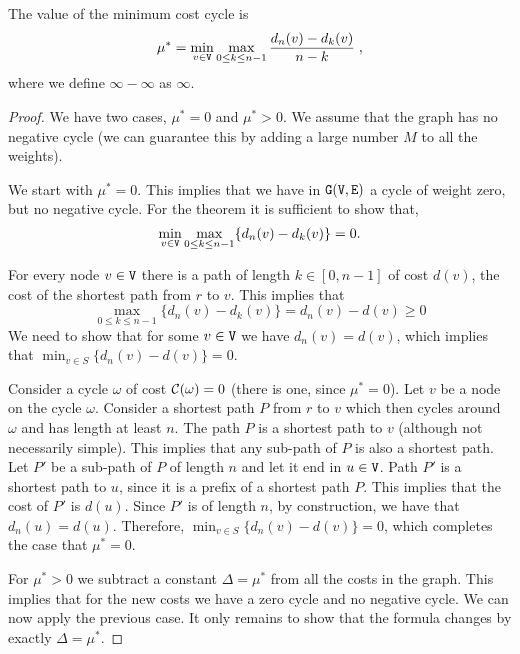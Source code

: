 \begin{theorem}
The value of the minimum cost cycle is
\[
\mu^*=\min_{v\in {\tt V}} \max_{0\leq k \leq n-1}
\frac{d_n(v)-d_{k}(v)}{n-k}\;,
\]
where we define $\infty-\infty$ as $\infty$.
\end{theorem}

\begin{proof}
We have two cases, $\mu^*=0$ and $\mu^*>0$. We assume that the graph
has no negative cycle (we can guarantee this by adding a large
number $M$ to all the weights).

We start with $\mu^*=0$. This implies that we have in ${\tt G}({\tt V},{\tt E})$ a
cycle of weight zero, but no negative cycle. For the theorem it is
sufficient to show that,
\[
\min_{v\in {\tt V}} \max_{0\leq k \leq n-1} \{d_n(v)-d_{k}(v)\}=0.
\]

For every node $v\in {\tt V}$ there is a path of length $k\in[0,n-1]$ of
cost $d(v)$, the cost of the shortest path from $r$ to $v$. This
implies that
\[
\max_{0\leq k \leq n-1} \{d_n(v)-d_{k}(v)\}=d_n(v)-d(v)\geq 0
\]
We need to show that for some $v\in {\tt V}$ we have $d_n(v)=d(v)$, which
implies that $\min_{v\in S} \{d_n(v)-d(v)\}=0$.

Consider a cycle $\omega$ of cost $\mathcal{C}(\omega)=0$ (there is one,
since $\mu^*=0$). Let $v$ be a node on the cycle $\omega$. Consider
a shortest path $P$ from $r$ to $v$ which then cycles around $\omega$ and has
length at least $n$. The path $P$ is a shortest path to $v$
(although not necessarily simple). This implies that any sub-path of
$P$ is also a shortest path. Let $P'$ be a sub-path of $P$ of length
$n$ and let it end in $u\in {\tt V}$.
%
Path $P'$ is a shortest path to $u$, since it is a prefix of a
shortest path $P$.
%
This implies that the cost of $P'$ is $d(u)$. Since $P'$ is of
length $n$, by construction, we have that $d_n(u)=d(u)$. Therefore,
$\min_{v\in S} \{d_n(v)-d(v)\}=0$, which completes the case that
$\mu^*=0$.

For $\mu^*>0$ we subtract a constant $\Delta=\mu^*$ from all the
costs in the graph. This implies that for the new costs we have a
zero cycle and no negative cycle. We can now apply the previous
case. It only remains to show that the formula changes by exactly
$\Delta=\mu^*$.


\end{proof}
